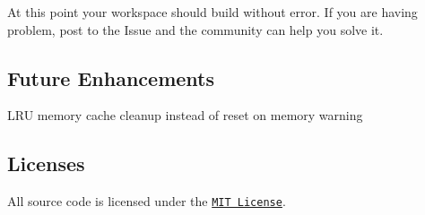 At this point your workspace should build without error. If you are having problem, post to the Issue and the community can help you solve it.

\subsection*{Future Enhancements }


\begin{DoxyItemize}
\item L\+RU memory cache cleanup instead of reset on memory warning
\end{DoxyItemize}

\subsection*{Licenses}

All source code is licensed under the \href{https://raw.github.com/rs/SDWebImage/master/LICENSE}{\tt M\+IT License}. 